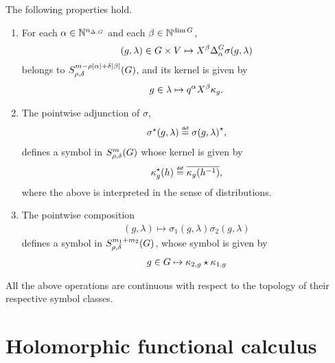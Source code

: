 \begin{proposition}
    The following properties hold.
    \begin{enumerate}
        \item For each $\alpha \in \mathbb{N}^{n_{\Delta, G}}$ and each $\beta \in \mathbb{N}^{\dim G}$,
            \begin{align*}
                (g, \lambda) \in \Group \times \VectorSpace \mapsto
                \LeftDifferentialOperator \beta \DifferenceOperator \alpha \sigma(g, \lambda)
            \end{align*}
            belongs to $S^{m - \rho \left|{\alpha}\right| + \delta \left|{\beta}\right|}_{\rho, \delta}(G)$,
            and its kernel is given by
            \begin{align*}
                g \in \lambda \mapsto q^\alpha \LeftDifferentialOperator \beta \kappa_g.
            \end{align*}
        \item The pointwise adjunction of $\sigma$,
            \begin{align*}
                \adj \sigma(g, \lambda) \defeq \adj {\sigma(g, \lambda)},
            \end{align*}
            defines a symbol in $S^{m}_{\rho, \delta}(G)$ whose kernel is given by
            \begin{align*}
                \adj \kappa_g(h) \defeq \conj {\kappa_g(h^{-1})},
            \end{align*}
            where the above is interpreted in the sense of distributions.
        \item
            \label{item:properties_of_symbols:pointwise_composition}
            The pointwise composition
            \begin{align*}
                (g, \lambda) \mapsto \sigma_1(g, \lambda) \sigma_2(g, \lambda)
            \end{align*}
            defines a symbol in $S^{m_1 + m_2}_{\rho, \delta}(G)$,
            whose symbol is given by
            \begin{align*}
                g \in G \mapsto \kappa_{2, g} \star \kappa_{1, g}
            \end{align*}
    \end{enumerate}

    All the above operations are continuous with respect to the topology of their respective symbol classes.
\end{proposition}

\section{Holomorphic functional calculus}
\label{section:functional_calculus}

